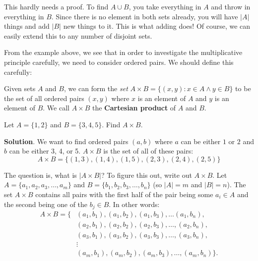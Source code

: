 \documentclass[11pt,]{book}
\newcommand{\terminology}[1]{\textbf{#1}}
\theoremstyle{ptxplainnotitle}
\theoremstyle{ptxplaintitle}
\theoremstyle{ptxdefinitionnotitle}
\theoremstyle{ptxdefinitiontitle}
\theoremstyle{ptxdefinitionnotitle}
\theoremstyle{ptxdefinitiontitle}
\theoremstyle{ptxdefinitionnotitle}
\theoremstyle{ptxdefinitiontitle}
\theoremstyle{ptxdefinitiontitlenonumber}
\theoremstyle{ptxdefinitiontitlenonumber}
\numberwithin{equation}{chapter}
\newcommand{\st}{:}
\newcommand{\card}[1]{\left| #1 \right|}
\newcommand{\amp}{&}
\begin{document}
\hypertarget{p-1067}{}%
This hardly needs a proof. To find \(A \cup B\), you take everything in \(A\) and throw in everything in \(B\). Since there is no element in both sets already, you will have \(\card{A}\) things and add \(\card{B}\) new things to it. This is what adding does! Of course, we can easily extend this to any number of disjoint sets.%
\par
\hypertarget{p-1068}{}%
From the example above, we see that in order to investigate the multiplicative principle carefully, we need to consider ordered pairs. We should define this carefully:%
\begin{assemblage}\label{assemblage-14}
\hypertarget{p-1069}{}%
Given sets \(A\) and \(B\), we can form the \emph{set} \(A \times B = \{(x,y) \st x \in A \wedge y \in B\}\) to be the set of all ordered pairs \((x,y)\) where \(x\) is an element of \(A\) and \(y\) is an element of \(B\). We call \(A \times B\) the \terminology{Cartesian product} of \(A\) and \(B\).%
\end{assemblage}
\begin{example}\label{example-40}
\hypertarget{p-1070}{}%
Let \(A = \{1,2\}\) and \(B=\{3,4,5\}\). Find \(A \times B\).%
\par\smallskip%
\noindent\textbf{Solution}.\hypertarget{solution-149}{}\quad%
\hypertarget{p-1071}{}%
We want to find ordered pairs \((a,b)\) where \(a\) can be either \(1\) or \(2\) and \(b\) can be either 3, 4, or 5. \(A \times B\) is the set of all of these pairs:%
\begin{equation*}
A \times B = \{(1,3), (1,4), (1,5), (2,3), (2,4), (2,5)\}
\end{equation*}
%
\end{example}
\hypertarget{p-1072}{}%
The question is, what is \(\card{A \times B}\)? To figure this out, write out \(A \times B\). Let \(A = \{a_1,a_2, a_3, \ldots, a_m\}\) and \(B = \{b_1,b_2, b_3, \ldots, b_n\}\) (so \(\card{A} = m\) and \(\card{B} = n\)). The set \(A \times B\) contains all pairs with the first half of the pair being some \(a_i \in A\) and the second being one of the \(b_j \in B\). In other words:%
\begin{align*}
A \times B = \{ \amp (a_1, b_1), (a_1, b_2), (a_1, b_3), \ldots (a_1, b_n),\\
\amp (a_2, b_1), (a_2, b_2), (a_2, b_3), \ldots, (a_2, b_n),\\
\amp (a_3, b_1), (a_3, b_2), (a_3, b_3), \ldots, (a_3, b_n),\\
\amp \vdots\\
\amp (a_m, b_1), (a_m, b_2), (a_m, b_3), \ldots, (a_m, b_n)\}.
\end{align*}
\end{document}
